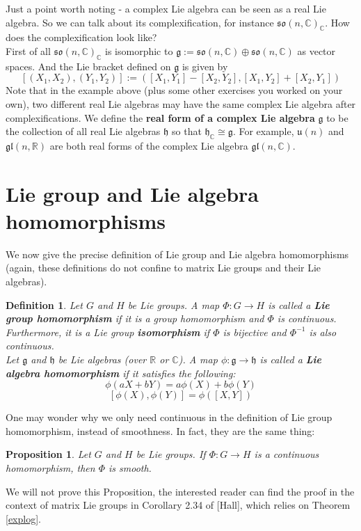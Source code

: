 \documentclass[11pt]{book}
\newtheorem{proposition}[theorem]{Proposition}
\newtheorem{definition}[theorem]{Definition}
\newcommand{\bb}[1]{\mathbb{#1}}
\newcommand{\mf}[1]{\mathfrak{#1}}
\begin{document}
Just a point worth noting - a complex Lie algebra can be seen as a real Lie algebra. So we can talk about its complexification, for instance $\mf{so}(n,\bb{C})_{\bb{C}}$. How does the complexification look like?\\
First of all $\mf{so}(n,\bb{C})_{\bb{C}}$ is isomorphic to $\mf{g} := \mf{so}(n,\bb{C}) \oplus \mf{so}(n,\bb{C})$ as vector spaces. And the Lie bracket defined on $\mf{g}$ is given by
$$[(X_1, X_2), (Y_1, Y_2)] := ([X_1,Y_1] - [X_2,Y_2], [X_1,Y_2]+[X_2,Y_1])$$
Note that in the example above (plus some other exercises you worked on your own), two different real Lie algebras may have the same complex Lie algebra after complexifications. We define the \textbf{real form of a complex Lie algebra} $\mf{g}$ to be the collection of all real Lie algebras $\mf{h}$ so that $\mf{h}_{\bb{C}} \cong \mf{g}$. For example, $\mf{u}(n)$ and $\mf{gl}(n,\bb{R})$ are both real forms of the complex Lie algebra $\mf{gl}(n,\bb{C})$.


\section{Lie group and Lie algebra homomorphisms} \label{liehom}
We now give the precise definition of Lie group and Lie algebra homomorphisms (again, these definitions do not confine to matrix Lie groups and their Lie algebras).
\begin{definition}
Let $G$ and $H$ be Lie groups. A map $\Phi: G \to H$ is called a \textbf{Lie group homomorphism} if it is a group homomorphism and $\Phi$ is continuous. Furthermore, it is a Lie group \textbf{isomorphism} if $\Phi$ is bijective and $\Phi^{-1}$ is also continuous.\\

\noindent Let $\mf{g}$ and $\mf{h}$ be Lie algebras (over $\bb{R}$ or $\bb{C}$). A map $\phi: \mf{g} \to \mf{h}$ is called a \textbf{Lie algebra homomorphism} if it satisfies the following:
$$\phi(aX+bY) = a\phi(X) + b\phi(Y)$$
$$[\phi(X), \phi(Y)] = \phi([X,Y])$$
\end{definition}

One may wonder why we only need continuous in the definition of Lie group homomorphism, instead of smoothness. In fact, they are the same thing:
\begin{proposition}
Let $G$ and $H$ be Lie groups. If $\Phi: G \to H$ is a continuous homomorphism, then $\Phi$ is smooth.
\end{proposition}
We will not prove this Proposition, the interested reader can find the proof in the context of matrix Lie groups in Corollary 2.34 of [Hall], which relies on Theorem \ref{explog}. \\
\end{document}
